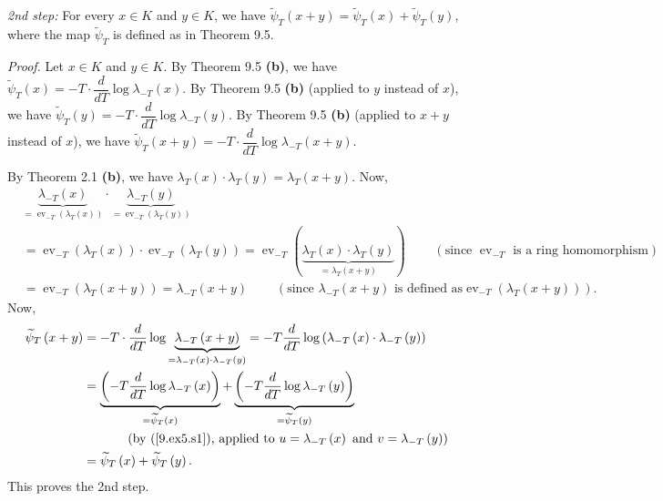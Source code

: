 \documentclass[numbers=enddot,12pt,final,onecolumn,notitlepage]{scrartcl}%
\begin{document}
\textit{2nd step:} For every $x\in K$ and $y\in K$, we have $\widetilde{\psi
}_{T}\left(  x+y\right)  =\widetilde{\psi}_{T}\left(  x\right)
+\widetilde{\psi}_{T}\left(  y\right)  $, where the map $\widetilde{\psi}_{T}$
is defined as in Theorem 9.5.

\textit{Proof.} Let $x\in K$ and $y\in K$. By Theorem 9.5 \textbf{(b)}, we
have $\widetilde{\psi}_{T}\left(  x\right)  =-T\cdot\dfrac{d}{dT}\log
\lambda_{-T}\left(  x\right)  $. By Theorem 9.5 \textbf{(b)} (applied to $y$
instead of $x$), we have $\widetilde{\psi}_{T}\left(  y\right)  =-T\cdot
\dfrac{d}{dT}\log\lambda_{-T}\left(  y\right)  $. By Theorem 9.5 \textbf{(b)}
(applied to $x+y$ instead of $x$), we have $\widetilde{\psi}_{T}\left(
x+y\right)  =-T\cdot\dfrac{d}{dT}\log\lambda_{-T}\left(  x+y\right)  $.

By Theorem 2.1 \textbf{(b)}, we have $\lambda_{T}\left(  x\right)
\cdot\lambda_{T}\left(  y\right)  =\lambda_{T}\left(  x+y\right)  $. Now,%
\begin{align*}
&  \underbrace{\lambda_{-T}\left(  x\right)  }_{=\operatorname*{ev}%
\nolimits_{-T}\left(  \lambda_{T}\left(  x\right)  \right)  }\cdot
\underbrace{\lambda_{-T}\left(  y\right)  }_{=\operatorname*{ev}%
\nolimits_{-T}\left(  \lambda_{T}\left(  y\right)  \right)  }\\
&  =\operatorname*{ev}\nolimits_{-T}\left(  \lambda_{T}\left(  x\right)
\right)  \cdot\operatorname*{ev}\nolimits_{-T}\left(  \lambda_{T}\left(
y\right)  \right)  =\operatorname*{ev}\nolimits_{-T}\left(
\underbrace{\lambda_{T}\left(  x\right)  \cdot\lambda_{T}\left(  y\right)
}_{=\lambda_{T}\left(  x+y\right)  }\right)  \ \ \ \ \ \ \ \ \ \ \left(
\text{since }\operatorname*{ev}\nolimits_{-T}\text{ is a ring homomorphism}%
\right) \\
&  =\operatorname*{ev}\nolimits_{-T}\left(  \lambda_{T}\left(  x+y\right)
\right)  =\lambda_{-T}\left(  x+y\right)  \ \ \ \ \ \ \ \ \ \ \left(
\text{since }\lambda_{-T}\left(  x+y\right)  \text{ is defined as
}\operatorname*{ev}\nolimits_{-T}\left(  \lambda_{T}\left(  x+y\right)
\right)  \right)  .
\end{align*}
Now,%
\begin{align*}
\widetilde{\psi}_{T}\left(  x+y\right)   &  =-T\cdot\dfrac{d}{dT}%
\log\underbrace{\lambda_{-T}\left(  x+y\right)  }_{=\lambda_{-T}\left(
x\right)  \cdot\lambda_{-T}\left(  y\right)  }=-T\dfrac{d}{dT}\log\left(
\lambda_{-T}\left(  x\right)  \cdot\lambda_{-T}\left(  y\right)  \right) \\
&  =\underbrace{\left(  -T\dfrac{d}{dT}\log\lambda_{-T}\left(  x\right)
\right)  }_{=\widetilde{\psi}_{T}\left(  x\right)  }+\underbrace{\left(
-T\dfrac{d}{dT}\log\lambda_{-T}\left(  y\right)  \right)  }_{=\widetilde{\psi
}_{T}\left(  y\right)  }\\
&  \ \ \ \ \ \ \ \ \ \ \left(  \text{by (\ref{9.ex5.s1}), applied to
}u=\lambda_{-T}\left(  x\right)  \text{ and }v=\lambda_{-T}\left(  y\right)
\right) \\
&  =\widetilde{\psi}_{T}\left(  x\right)  +\widetilde{\psi}_{T}\left(
y\right)  .
\end{align*}
This proves the 2nd step.
\end{document}
